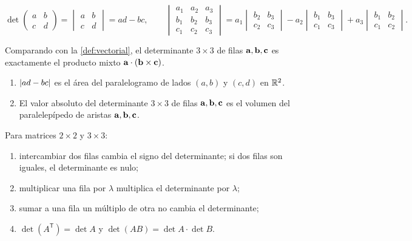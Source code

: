 \begin{definicion}[Determinantes]\label{def:det3}
\[
\det\begin{pmatrix}a&b\\c&d\end{pmatrix}=\begin{vmatrix}a&b\\c&d\end{vmatrix}=ad-bc,
\qquad
\begin{vmatrix}a_1&a_2&a_3\\b_1&b_2&b_3\\c_1&c_2&c_3\end{vmatrix}
=a_1\begin{vmatrix}b_2&b_3\\c_2&c_3\end{vmatrix}-a_2\begin{vmatrix}b_1&b_3\\c_1&c_3\end{vmatrix}+a_3\begin{vmatrix}b_1&b_2\\c_1&c_2\end{vmatrix}.
\]
\end{definicion}

Comparando con la \cref{def:vectorial}, el determinante $3\times3$ de filas $\mathbf{a},\mathbf{b},\mathbf c$ es exactamente el producto mixto $\mathbf{a}\cdot(\mathbf{b}\times\mathbf c)$.

\begin{teorema}\label{teo:det-area}
\begin{enumerate}
  \item $\lvert ad-bc\rvert$ es el área del paralelogramo de lados $(a,b)$ y $(c,d)$ en $\mathbb{R}^2$.
  \item El valor absoluto del determinante $3\times3$ de filas $\mathbf{a},\mathbf{b},\mathbf c$ es el volumen del paralelepípedo de aristas $\mathbf{a},\mathbf{b},\mathbf c$.
\end{enumerate}
\end{teorema}

\begin{proposicion}\label{prop:det-propiedades}
Para matrices $2\times2$ y $3\times3$:
\begin{enumerate}
  \item intercambiar dos filas cambia el signo del determinante; si dos filas son iguales, el determinante es nulo;
  \item multiplicar una fila por $\lambda$ multiplica el determinante por $\lambda$;
  \item sumar a una fila un múltiplo de otra no cambia el determinante;
  \item $\det(A^{\mathsf T})=\det A$ y $\det(AB)=\det A\cdot\det B$.
\end{enumerate}
\end{proposicion}

